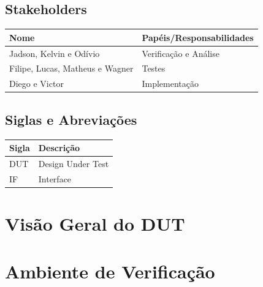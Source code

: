 \documentclass{article}
\begin{document}
	\subsection{Stakeholders}
  \FloatBarrier
  \begin{table}[H] 
    \begin{center}
      \begin{tabular}[pos]{|m{5cm} | m{8cm}|} 
        \hline %
        \cellcolor[gray]{0.9}\textbf{Nome} & \cellcolor[gray]{0.9}
		\textbf{Papéis/Responsabilidades} \\ 
        \hline Jadson, Kelvin e Odívio & Verificação e Análise \\ \hline
         Filipe, Lucas, Matheus e Wagner & Testes \\ \hline
         Diego e Victor & Implementação \\ \hline
      \end{tabular}
    \end{center}
  \end{table} 
  
  \subsection{Siglas e Abreviações}
  \FloatBarrier
  \begin{table}[H]
    \begin{center}
      \begin{tabular}[pos]{|m{2cm} | m{11cm}|} 
				\hline 
				\cellcolor[gray]{0.9}\textbf{Sigla} & \cellcolor[gray]{0.9}\textbf{Descrição} \\ \hline
				DUT & Design Under Test \\ \hline
        		IF  & Interface \\ \hline
      \end{tabular}
    \end{center}
  \end{table}  

	\newpage
	\section{Visão Geral do DUT}
	
	
  	
	\newpage
	\section{Ambiente de Verificação}
	
\end{document}
